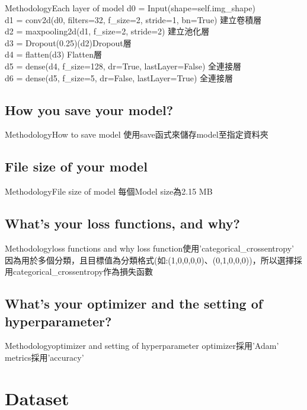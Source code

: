 \documentclass{beamer}
\begin{document}
\begin{CJK}{UTF8}{nkai}
\begin{frame}{Methodology}{Each layer of model}
d0 = Input(shape=self.img\_shape)\\
 d1 = conv2d(d0, filters=32, f\_size=2, stride=1, bn=True) 建立卷積層\\
 d2 = maxpooling2d(d1, f\_size=2, stride=2) 建立池化層\\
 d3 = Dropout(0.25)(d2)Dropout層\\
d4 = flatten(d3)  Flatten層\\
d5 = dense(d4, f\_size=128, dr=True, lastLayer=False) 全連接層\\
 d6 = dense(d5, f\_size=5, dr=False, lastLayer=True) 全連接層\\

\end{frame}

\subsection{How you save your model?}
\begin{frame}{Methodology}{How to save  model}
	使用save函式來儲存model至指定資料夾
\end{frame}
\subsection{File size of your model}
\begin{frame}{Methodology}{File size of model}
	每個Model size為2.15 MB
\end{frame}
\subsection{What's your loss functions, and why?}
\begin{frame}{Methodology}{loss functions and why}
	loss function使用'categorical\_crossentropy'\\
	因為用於多個分類，且目標值為分類格式(如:(1,0,0,0,0)、(0,1,0,0,0))，所以選擇採用categorical\_crossentropy作為損失函數
\end{frame}
\subsection{What's your optimizer and the setting of hyperparameter?}
\begin{frame}{Methodology}{optimizer and setting of hyperparameter}
	optimizer採用'Adam'\\
	metrics採用'accuracy'
\end{frame}
\section{Dataset}

\end{CJK}
\end{document}

